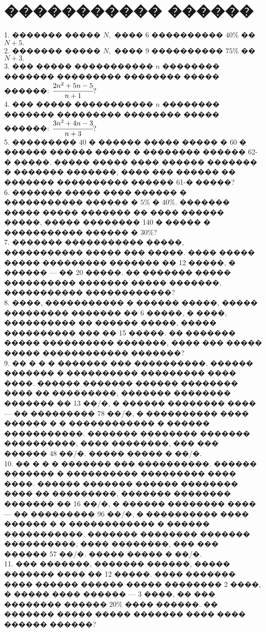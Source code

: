 \documentclass[12pt]{article}
\begin{document}
\section{����������� ������}
1. ������� ����� $N,$ ���� 6 ���������� $40\%$ �� $N+5.$\\
2. ������� ����� $N,$ ���� 9 ���������� $75\%$ �� $N+3.$\\
3. ��� ����� ����������� $n$ �������� ������� ��������� �������� ����� ������: $\cfrac{2n^2+5n-5}{n+1}?$\\
4. ��� ����� ����������� $n$ �������� ������� ��������� �������� ����� ������: $\cfrac{3n^2+4n-3}{n+3}?$\\
5. ��������� 40 � ������ ����� ����� � 60 � ������ ������ ����� � �������� ������ 62-� �����. ����� ����� ���� ������ ������� � ������� �������, ���� ��� ������ �� ������� ���������� ������ 61-� �����?\\
6. ������� ����� ���� ������ � ����������� ������ � $5\%$ � $40\%.$ ������� ����� ����� ������� �� ���� ������ �����, ����� �������� 140 � ����� � ����������� ������ � $30\%?$\\
7. ������� ����������� �����, ����������� ����� ��� �����. ���� ����� ����� ��������� ������� �� 12 �����, � ������ --- �� 20 �����. �� ������� ����� ���������� ������� ����� �������, ����������� ������������?\\
8. ����, ����������� � ������ �����, ����� ��������� ������� �� 6 �����, � ����, ���������� �� ������ �����, ����� ���������� ��� �� 15 �����. �� ������� ����� ���������� �������, ���� ��� ����� ����� ������������ �������?\\
9. �� � � � ������� ��� ����������. ������ ������� � ���������� ��������� ���� ����. ������ ������� ������ �������� ���� �� ���������, ������� �������� ������� �� 13 ��/�, � ������ �������� ���� --- �� ��������� 78 ��/�, � ���������� ���� ������ � � ������������ � ������ �����������. ������� �������� ������� ����������, ���� ��������, ��� ��� ������ 48 ��/�. ����� ����� � ��/�.\\
10. �� � � � ������� ��� ����������. ������ ������� � ���������� ��������� ���� ����. ������ ������� ������ �������� ���� �� ���������, ������� �������� ������� �� 16 ��/�, � ������ �������� ���� --- �� ��������� 96 ��/�, � ���������� ���� ������ � � ������������ � ������ �����������. ������� �������� ������� ����������, ���� ��������, ��� ��� ������ 57 ��/�. ����� ����� � ��/�.\\
11. ��� �������, ������� ������, ����� ������� ���� �� 12 �����. ���� ������� ���� ������ ������ ����� �������� 2 ����, � ����� ���� ������ --- 3 ����, �� ��� �������� ������ $20\%$ ���� ������. �� ������� ����� ����� ������� ���� ���� ������ ������?\\
\end{document}
